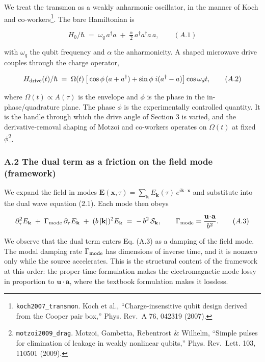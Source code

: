 \documentclass[
  11pt,
]{article}
\begin{document}
We treat the transmon as a weakly anharmonic oscillator, in the manner
of Koch and co-workers\footnote{\texttt{koch2007\_transmon}. Koch et
  al., ``Charge-insensitive qubit design derived from the Cooper pair
  box,'' Phys. Rev.~A 76, 042319 (2007).}. The bare Hamiltonian is

\[
H_0/\hbar \;=\; \omega_q\,a^\dagger a \;+\; \tfrac{\alpha}{2}\,a^\dagger a^\dagger a\,a, \qquad (A.1)
\]

with \(\omega_q\) the qubit frequency and \(\alpha\) the anharmonicity.
A shaped microwave drive couples through the charge operator,

\[
H_{\rm drive}(t)/\hbar \;=\; \Omega(t)\,\big[\cos\phi\,(a+a^\dagger) + \sin\phi\;i(a^\dagger-a)\big]\cos\omega_d t, \qquad (A.2)
\]

where \(\Omega(t)\propto A(\tau)\) is the envelope and \(\phi\) is the
phase in the in-phase/quadrature plane. The phase \(\phi\) is the
experimentally controlled quantity. It is the handle through which the
drive angle of Section 3 is varied, and the derivative-removal shaping
of Motzoi and co-workers operates on \(\Omega(t)\) at fixed
\(\phi\)\footnote{\texttt{motzoi2009\_drag}. Motzoi, Gambetta,
  Rebentrost \& Wilhelm, ``Simple pulses for elimination of leakage in
  weakly nonlinear qubits,'' Phys. Rev.~Lett. 103, 110501 (2009).}.

\hypertarget{a.2-the-dual-term-as-a-friction-on-the-field-mode-framework}{%
\subsubsection{A.2 The dual term as a friction on the field mode
(framework)}\label{a.2-the-dual-term-as-a-friction-on-the-field-mode-framework}}

We expand the field in modes
\(\mathbf{E}(\mathbf{x},\tau)=\sum_{\mathbf k}E_{\mathbf k}(\tau)\,e^{i\mathbf{k}\cdot\mathbf{x}}\)
and substitute into the dual wave equation (2.1). Each mode then obeys

\[
\partial_\tau^2 E_{\mathbf k} \;+\; \Gamma_{\rm mode}\,\partial_\tau E_{\mathbf k} \;+\; (b\,|\mathbf{k}|)^2 E_{\mathbf k} \;=\; -\,b^2\,\mathcal{S}_{\mathbf k}, \qquad \Gamma_{\rm mode}=\frac{\mathbf{u}\!\cdot\!\mathbf{a}}{b^2}. \qquad (A.3)
\]

We observe that the dual term enters Eq. (A.3) as a damping of the field
mode. The modal damping rate \(\Gamma_{\rm mode}\) has dimensions of
inverse time, and it is nonzero only while the source accelerates. This
is the structural content of the framework at this order: the
proper-time formulation makes the electromagnetic mode lossy in
proportion to \(\mathbf{u}\!\cdot\!\mathbf{a}\), where the textbook
formulation makes it lossless.
\end{document}

